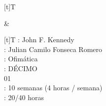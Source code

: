 \documentclass[letterpaper,10pt,spanish]{sphinxmanual}
\begin{document}
\begin{savenotes}\sphinxattablestart
\sphinxthistablewithglobalstyle
\centering
\begin{tabular}[t]{}
\sphinxtoprule
\sphinxtableatstartofbodyhook

\begin{savenotes}\sphinxattablestart
\sphinxthistablewithglobalstyle
\centering
\begin{tabulary}{\linewidth}[t]{T}
\sphinxtoprule
\sphinxtableatstartofbodyhook
\sphinxAtStartPar
{}
\\
\sphinxbottomrule
\end{tabulary}
\sphinxtableafterendhook\par
\sphinxattableend\end{savenotes}
&

\begin{savenotes}\sphinxattablestart
\sphinxthistablewithglobalstyle
\centering
\begin{tabulary}{\linewidth}[t]{T}
\sphinxtoprule
\sphinxtableatstartofbodyhook
\sphinxAtStartPar
{}: John F. Kennedy
\\
\sphinxhline
\sphinxAtStartPar
{}: Julian Camilo Fonseca Romero
\\
\sphinxhline
\sphinxAtStartPar
{}: Ofimática
\\
\sphinxhline
\sphinxAtStartPar
{}: DÉCIMO
\\
\sphinxhline
\sphinxAtStartPar
{} 01
\\
\sphinxhline
\sphinxAtStartPar
{}: 10 semanas (4 horas / semana)
\\
\sphinxhline
\sphinxAtStartPar
{}: 20/40 horas
\\
\sphinxbottomrule
\end{tabulary}
\sphinxtableafterendhook\par
\sphinxattableend\end{savenotes}
\\
\sphinxbottomrule
\end{tabular}
\sphinxtableafterendhook\par
\sphinxattableend\end{savenotes}
\end{document}
